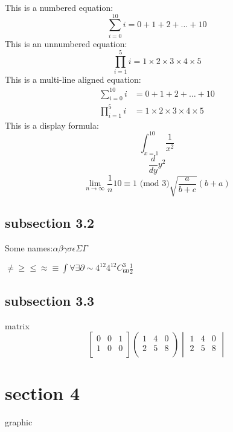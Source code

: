 \documentclass{ctexart}
\begin{document}
This is a numbered equation:
\begin{equation}
\sum_{i=0}^{10} i = 0 + 1 + 2 + \ldots + 10
\end{equation}
This is an unnumbered equation:
\begin{equation*}
\prod_{i=1}^5 i = 1 \times 2 \times 3 \times 4 \times 5
\end{equation*}
This is a multi-line aligned equation:
\begin{align}
\sum_{i=0}^{10} i &= 0 + 1 + 2 + \ldots + 10 \\
\prod_{i=1}^5 i &= 1 \times 2 \times 3 \times 4 \times 5 
\end{align}
This is a display formula:
\[
\int_{x=1}^{10}\frac{1}{x^2} 
\]
\[
\frac{d}{dy} y^2
\]
\[
\lim_{n\to \infty} \frac{1}{n}
10 \equiv 1 \text{ (mod 3)}
\sqrt{\frac{a}{b+c}}(b+a)
\]


\subsection{subsection 3.2}
Some names:$\alpha \beta \gamma \sigma \epsilon \Sigma \Gamma$

$\neq \geq \leq \approx \equiv \int \forall \exists \partial \mathcal \sim 4^{12} 4^12 C_{60}^{3} \frac{1}{2}$

\subsection{subsection 3.3}
matrix
$$
\begin{bmatrix}
0 & 0 & 1 \\ 
1 & 0 & 0 \\ 
\end{bmatrix}
\begin{pmatrix}
1 & 4 & 0 \\ 
2 & 5 & 8 \\
\end{pmatrix}
\begin{vmatrix}
1 & 4 & 0 \\ 
2 & 5 & 8 \\
\end{vmatrix}
$$

\section{section 4}
graphic
\end{document}
